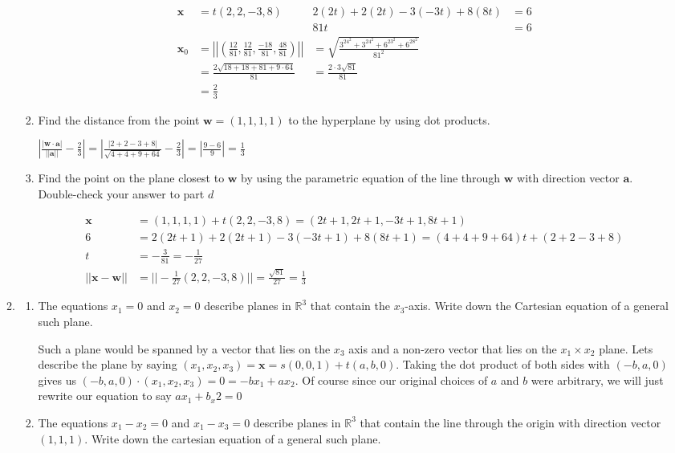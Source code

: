 \documentclass[letterpaper]{article}
\begin{document}
\begin{enumerate}
\begin{enumerate}
\begin{enumerate}
      \begin{align*}
        \mathbf{x}&=t(2,2,-3,8)&2(2t)+2(2t)-3(-3t)+8(8t)&=6\\
        &&81t&=6\\
        \mathbf{x}_0&=\left\lvert\left\lvert\left(\frac{12}{81},\frac{12}{81},\frac{-18}{81},\frac{48}{81}\right)\right\rvert\right\rvert&=\sqrt{\frac{3^24^2+3^24^2+6^23^2+6^28^2}{81^2}}\\
        &=\frac{2\sqrt{18+18+81+9\cdot64}}{81}&=\frac{2\cdot3\sqrt{81}}{81}\\
        &=\frac{2}{3}
      \end{align*}
    \item
      Find the distance from the point $\mathbf{w}=(1,1,1,1)$ to the hyperplane by using dot products.

      $\left\lvert\frac{\left\lvert\mathbf{w}\cdot\mathbf{a}\right\rvert}{||\mathbf{a}||}-\frac{2}{3}\right\rvert=\left\lvert\frac{\left\lvert 2+2-3+8\right\rvert}{\sqrt{4+4+9+64}}-\frac{2}{3}\right\rvert=\left\lvert\frac{9-6}{9}\right\rvert=\frac{1}{3}$
    \item
      Find the point on the plane closest to $\mathbf{w}$ by using the parametric equation of the line through $\mathbf{w}$ with direction vector $\mathbf{a}$. Double-check your answer to part $d$

      \begin{align*}
        \mathbf{x}&=(1,1,1,1)+t(2,2,-3,8)=(2t+1,2t+1,-3t+1,8t+1)\\
        6&=2(2t+1)+2(2t+1)-3(-3t+1)+8(8t+1)=(4+4+9+64)t+(2+2-3+8)\\
        t&=-\frac{3}{81}=-\frac{1}{27}\\
        ||\mathbf{x}-\mathbf{w}||&=||-\frac{1}{27}(2,2,-3,8)||=\frac{\sqrt{81}}{27}=\frac{1}{3}
      \end{align*}
    \end{enumerate}
  \item
    \begin{enumerate}
    \item
      The equations $x_1=0$ and $x_2=0$ describe planes in $\mathbb{R}^3$ that contain the $x_3$-axis. Write down the Cartesian equation of a general such plane.

      Such a plane would be spanned by a vector that lies on the $x_3$ axis and a non-zero vector that lies on the $x_1\times x_2$ plane. Lets describe the plane by saying $(x_1,x_2,x_3)=\mathbf{x}=s(0,0,1)+t(a,b,0)$. Taking the dot product of both sides with $(-b,a,0)$ gives us $(-b,a,0)\cdot(x_1,x_2,x_3)=0=-bx_1+ax_2$. Of course since our original choices of $a$ and $b$ were arbitrary, we will just rewrite our equation to say $ax_1+b_x2=0$
    \item
      The equations $x_1-x_2=0$ and $x_1-x_3=0$ describe planes in $\mathbb{R}^3$ that contain the line through the origin with direction vector $(1,1,1)$. Write down the cartesian equation of a general such plane.


\end{enumerate}
\end{enumerate}
\end{enumerate}
\end{document}
